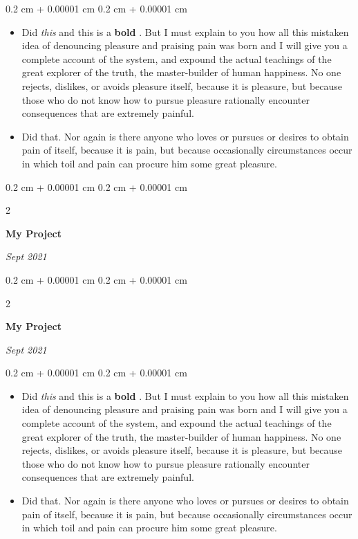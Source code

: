 \documentclass[10pt, letterpaper]{article}
\newenvironment{highlights}{
    \begin{itemize}[
        topsep=0.10 cm,
        parsep=0.10 cm,
        partopsep=0pt,
        itemsep=0pt,
        leftmargin=0.4 cm + 10pt
    ]
}{
    \end{itemize}
} %
\newenvironment{onecolentry}{
    \begin{adjustwidth}{
        0.2 cm + 0.00001 cm
    }{
        0.2 cm + 0.00001 cm
    }
}{
    \end{adjustwidth}
} %
\newenvironment{twocolentry}[2][]{
    \onecolentry
    \def\secondColumn{#2}
    \setcolumnwidth{\fill, 4.5 cm}
    \begin{paracol}{2}
}{
    \switchcolumn \raggedleft \secondColumn
    \end{paracol}
    \endonecolentry
} %
\let\hrefWithoutArrow\href
\renewcommand{\href}[2]{\hrefWithoutArrow{#1}{\ifthenelse{\equal{#2}{}}{ }{#2 }\raisebox{.15ex}{\footnotesize \faExternalLink*}}}
\begin{document}
        \vspace{0.10 cm}
        \begin{onecolentry}
            \begin{highlights}
                \item Did \textit{this} and this is a \textbf{bold} \href{https://example.com}{link}. But I must explain to you how all this mistaken idea of denouncing pleasure and praising pain was born and I will give you a complete account of the system, and expound the actual teachings of the great explorer of the truth, the master-builder of human happiness. No one rejects, dislikes, or avoids pleasure itself, because it is pleasure, but because those who do not know how to pursue pleasure rationally encounter consequences that are extremely painful.
                \item Did that. Nor again is there anyone who loves or pursues or desires to obtain pain of itself, because it is pain, but because occasionally circumstances occur in which toil and pain can procure him some great pleasure.
            \end{highlights}
        \end{onecolentry}


        \vspace{0.2 cm}

        \begin{twocolentry}{
            
            
        \textit{Sept 2021}}
            \textbf{My Project}
        \end{twocolentry}



        \vspace{0.2 cm}

        \begin{twocolentry}{
            
            
        \textit{Sept 2021}}
            \textbf{My Project}
        \end{twocolentry}

        \vspace{0.10 cm}
        \begin{onecolentry}
            \begin{highlights}
                \item Did \textit{this} and this is a \textbf{bold} \href{https://example.com}{link}. But I must explain to you how all this mistaken idea of denouncing pleasure and praising pain was born and I will give you a complete account of the system, and expound the actual teachings of the great explorer of the truth, the master-builder of human happiness. No one rejects, dislikes, or avoids pleasure itself, because it is pleasure, but because those who do not know how to pursue pleasure rationally encounter consequences that are extremely painful.
                \item Did that. Nor again is there anyone who loves or pursues or desires to obtain pain of itself, because it is pain, but because occasionally circumstances occur in which toil and pain can procure him some great pleasure.
            \end{highlights}
        \end{onecolentry}
\end{document}
